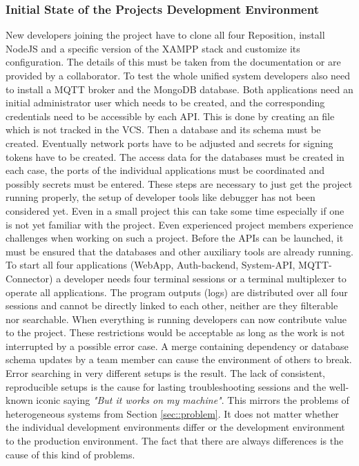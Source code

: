         \subsubsection{Initial State of the Projects Development Environment}
        New developers joining the project have to clone all four Reposition, install NodeJS and a specific version of the \ac{XAMPP} stack and customize its configuration. The details of this must be taken from the documentation or are provided by a collaborator. To test the whole unified system developers also need to install a MQTT broker and the MongoDB database. Both applications need an initial administrator user which needs to be created, and the corresponding credentials need to be accessible by each \ac{API}. This is done by creating an  file which is not tracked in the \ac{VCS}. Then a database and its schema must be created. Eventually network ports have to be adjusted and secrets for signing tokens have to be created.
        The access data for the databases must be created in each case, the ports of the individual applications must be coordinated and possibly secrets must be entered. These steps are necessary to just get the project running properly, the setup of developer tools like debugger has not been considered yet. Even in a small project this can take some time especially if one is not yet familiar with the project.\newline
        Even experienced project members experience challenges when working on such a project. Before the APIs can be launched, it must be ensured that the databases and other auxiliary tools are already running. To start all four applications (WebApp, Auth-backend, System-API, MQTT-Connector) a developer needs four terminal sessions or a terminal multiplexer to operate all applications. The program outputs (logs) are distributed over all four sessions and cannot be directly linked to each other, neither are they filterable nor searchable. When everything is running developers can now contribute value to the project. These restrictions would be acceptable as long as the work is not interrupted by a possible error case. A merge containing dependency or database schema updates by a team member can cause the environment of others to break. Error searching in very different setups is the result. The lack of consistent, reproducible setups is the cause for lasting troubleshooting sessions and the well-known iconic saying \textit{"But it works on my machine"}. This mirrors the problems of heterogeneous systems from Section \ref{sec::problem}. It does not matter whether the individual development environments differ or the development environment to the production environment. The fact that there are always differences is the cause of this kind of problems. \newline
